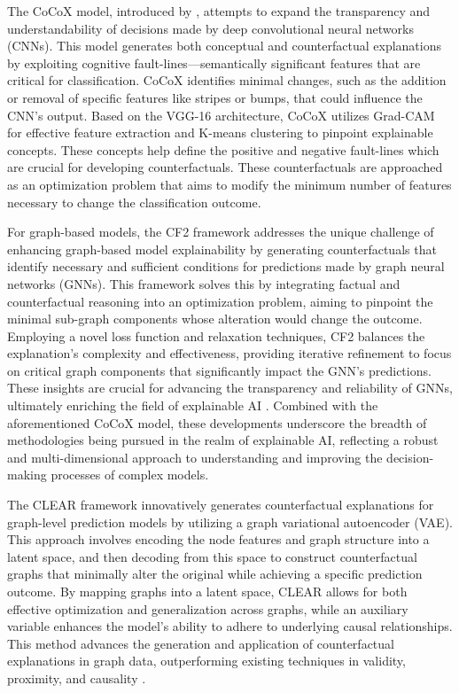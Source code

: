 The CoCoX model, introduced by \textcite{akula_cocox_2020}, attempts to expand
the transparency and understandability of decisions made by deep convolutional
neural networks (CNNs). This model generates both conceptual and counterfactual explanations
by exploiting cognitive fault-lines—semantically significant features that are critical
for classification. CoCoX identifies minimal changes, such as the addition or removal
of specific features like stripes or bumps, that could influence the CNN's
output. Based on the VGG-16 architecture, CoCoX utilizes Grad-CAM for effective
feature extraction and K-means clustering to pinpoint explainable concepts. These
concepts help define the positive and negative fault-lines which are crucial for
developing counterfactuals. These counterfactuals are approached as an
optimization problem that aims to modify the minimum number of features
necessary to change the classification outcome.

For graph-based models, the CF2 framework addresses the unique challenge of enhancing
graph-based model explainability by generating counterfactuals that identify necessary
and sufficient conditions for predictions made by graph neural networks (GNNs).
This framework solves this by integrating factual and counterfactual reasoning
into an optimization problem, aiming to pinpoint the minimal sub-graph components
whose alteration would change the outcome. Employing a novel loss function and
relaxation techniques, CF2 balances the explanation's complexity and effectiveness,
providing iterative refinement to focus on critical graph components that
significantly impact the GNN's predictions. These insights are crucial for advancing
the transparency and reliability of GNNs, ultimately enriching the field of
explainable AI \parencite{tan_learning_2022}. Combined with the aforementioned
CoCoX model, these developments underscore the breadth of methodologies being pursued
in the realm of explainable AI, reflecting a robust and multi-dimensional
approach to understanding and improving the decision-making processes of complex
models.

The CLEAR framework innovatively generates counterfactual explanations for graph-level
prediction models by utilizing a graph variational autoencoder (VAE). This approach
involves encoding the node features and graph structure into a latent space, and
then decoding from this space to construct counterfactual graphs that minimally
alter the original while achieving a specific prediction outcome. By mapping graphs
into a latent space, CLEAR allows for both effective optimization and
generalization across graphs, while an auxiliary variable enhances the model’s ability
to adhere to underlying causal relationships. This method advances the
generation and application of counterfactual explanations in graph data, outperforming
existing techniques in validity, proximity, and causality \parencite{ma_clear_2022}.

